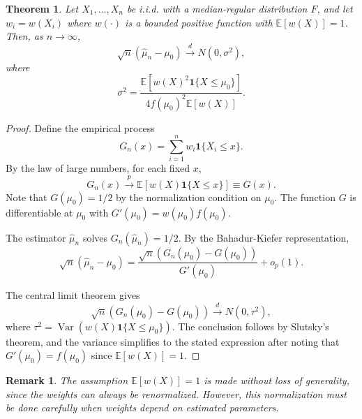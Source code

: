 \documentclass[12pt]{article}
\newtheorem{theorem}{Theorem}
\newtheorem{remark}{Remark}
\begin{document}
\begin{theorem}\label{thm:main}
Let $X_1, \ldots, X_n$ be i.i.d. with a median-regular distribution $F$, and let $w_i = w(X_i)$ where $w(\cdot)$ is a bounded positive function with $\mathbb{E}[w(X)] = 1$. Then, as $n \to \infty$,
\begin{equation}
    \sqrt{n}(\hat{\mu}_n - \mu_0) \xrightarrow{d} N\left(0, \sigma^2\right),
\end{equation}
where
\begin{equation}
    \sigma^2 = \frac{\mathbb{E}[w(X)^2 \mathbf{1}\{X \leq \mu_0\}]}{4 f(\mu_0)^2 \mathbb{E}[w(X)]}.
\end{equation}
\end{theorem}

\begin{proof}
Define the empirical process
\begin{equation}
    G_n(x) = \sum_{i=1}^n w_i \mathbf{1}\{X_i \leq x\}.
\end{equation}
By the law of large numbers, for each fixed $x$,
\begin{equation}
    G_n(x) \xrightarrow{p} \mathbb{E}[w(X) \mathbf{1}\{X \leq x\}] \equiv G(x).
\end{equation}
Note that $G(\mu_0) = 1/2$ by the normalization condition on $\mu_0$. The function $G$ is differentiable at $\mu_0$ with $G'(\mu_0) = w(\mu_0) f(\mu_0)$.

The estimator $\hat{\mu}_n$ solves $G_n(\hat{\mu}_n) = 1/2$. By the Bahadur-Kiefer representation,
\begin{equation}
    \sqrt{n}(\hat{\mu}_n - \mu_0) = \frac{\sqrt{n}(G_n(\mu_0) - G(\mu_0))}{G'(\mu_0)} + o_p(1).
\end{equation}

The central limit theorem gives
\begin{equation}
    \sqrt{n}(G_n(\mu_0) - G(\mu_0)) \xrightarrow{d} N(0, \tau^2),
\end{equation}
where $\tau^2 = \operatorname{Var}(w(X) \mathbf{1}\{X \leq \mu_0\})$. The conclusion follows by Slutsky's theorem, and the variance simplifies to the stated expression after noting that $G'(\mu_0) = f(\mu_0)$ since $\mathbb{E}[w(X)] = 1$.
\end{proof}

\begin{remark}
The assumption $\mathbb{E}[w(X)] = 1$ is made without loss of generality, since the weights can always be renormalized. However, this normalization must be done carefully when weights depend on estimated parameters.
\end{remark}
\end{document}
